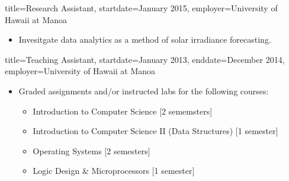 \documentclass{resume}
\begin{document}
\begin{job}{title=Research Assistant,
            startdate=January 2015,
            employer=University of Hawaii at Manoa}
    \begin{itemize}
        \item{Invesitgate data analytics as a method of solar irradiance forecasting.}
    \end{itemize}
\end{job}

\begin{job}{title=Teaching Assistant,
            startdate=January 2013,
            enddate=December 2014,
            employer=University of Hawaii at Manoa}
    \begin{itemize}
        \item{Graded assignments and/or instructed labs for the following courses:}
        \begin{itemize}
            \item{Introduction to Computer Science [2 sememsters]}
            \item{Introduction to Computer Science II (Data Structures) [1 semester]}
            \item{Operating Systems [2 semesters]}
            \item{Logic Design \& Microprocessors [1 semester]}
        \end{itemize}
    \end{itemize}
\end{job}
\end{document}
